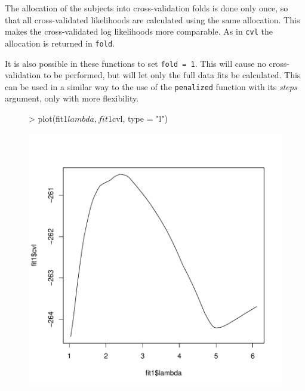 \documentclass[a4paper]{article}
\newcommand{\Robject}[1]{{\texttt{#1}}}
\newcommand{\Rfunction}[1]{{\texttt{#1}}}
\newcommand{\Rfunarg}[1]{{\textit{#1}}}
\begin{document}
The allocation of the subjects into cross-validation folds is done only once, so that all cross-validated likelihoods are calculated using the same allocation. This makes the cross-validated log likelihoods more comparable. As in \Rfunction{cvl} the allocation is returned in \Robject{fold}.

It is also possible in these functions to set \Robject{fold = 1}. This will cause no cross-validation to be performed, but will let only the full data fits be calculated. This can be used in a similar way to the use of the \Rfunction{penalized} function with its \Rfunarg{steps} argument, only with more flexibility.

\begin{Schunk}
\end{Schunk}

\begin{figure}
\begin{Schunk}
\begin{Sinput}
> plot(fit1$lambda, fit1$cvl, type = "l")
\end{Sinput}
\end{Schunk}
\includegraphics{penalized-profplot1}
\end{figure}
\end{document}
